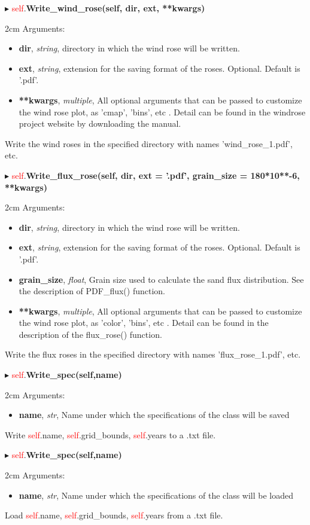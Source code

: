 \documentclass[12pt]{article}
\newenvironment{myenv}{\begin{adjustwidth}{2cm}{}}{\end{adjustwidth}}
\newcommand{\ClassFunction}[3]{\filbreak\noindent
$\blacktriangleright$ \quad \textcolor{red}{self}.\textbf{#1}

\begin{myenv}
Arguments: {#2}

{#3}
\end{myenv}
\vspace*{0.4 cm}}
\newcommand{\Argument}[3]{\noindent
\textbf{#1}, \textit{#2}, {#3}}
\begin{document}
\ClassFunction{Write\_wind\_rose(self, dir, ext, **kwargs)}{
\begin{itemize}
	\item \Argument{dir}{string}{directory in which the wind rose will be written.}
	\item \Argument{ext}{string}{extension for the saving format of the roses. Optional. Default is '.pdf'.}
	\item \Argument{**kwargs}{multiple}{All optional arguments that can be passed to customize the wind rose plot, as 'cmap', 'bins', etc . Detail can be found in the windrose project website by downloading the manual.}
\end{itemize}
}{Write the wind roses in the specified directory with names 'wind\_rose\_1.pdf', etc.}

\ClassFunction{Write\_flux\_rose(self, dir, ext = '.pdf', grain\_size = 180*10**-6, **kwargs)}{
\begin{itemize}
	\item \Argument{dir}{string}{directory in which the wind rose will be written.}
	\item \Argument{ext}{string}{extension for the saving format of the roses. Optional. Default is '.pdf'.}
	\item \Argument{grain\_size}{float}{Grain size used to calculate the sand flux distribution. See the description of PDF\_flux() function.}
	\item \Argument{**kwargs}{multiple}{All optional arguments that can be passed to customize the wind rose plot, as 'color', 'bins', etc . Detail can be found in the description of the flux\_rose() function.}
\end{itemize}
}{Write the flux roses in the specified directory with names 'flux\_rose\_1.pdf', etc.}

\ClassFunction{Write\_spec(self,name)}{
\begin{itemize}
	\item \Argument{name}{str}{Name under which the specifications of the class will be saved}
\end{itemize}
}{Write \textcolor{red}{self}.name, \textcolor{red}{self}.grid\_bounds, \textcolor{red}{self}.years to a .txt file.}


\ClassFunction{Write\_spec(self,name)}{
\begin{itemize}
	\item \Argument{name}{str}{Name under which the specifications of the class will be loaded}
\end{itemize}
}{Load \textcolor{red}{self}.name, \textcolor{red}{self}.grid\_bounds, \textcolor{red}{self}.years from a .txt file.}
\end{document}
